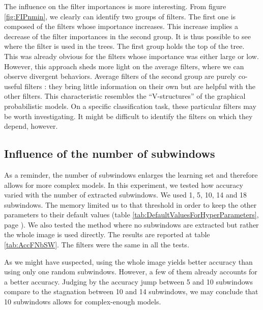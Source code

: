 \documentclass[a4paper]{report}
\newlength{\larg}
\begin{document}
	
		\par
		The influence on the filter importances is more interesting. From figure \ref{fig:FIPnmin}, we clearly can identify two groups of filters. The first one is composed of the filters whose importance increases. This increase implies a decrease of the filter importances in the second group. It is thus possible to see where the filter is used in the trees. The first group holds the top of the tree. This was already obvious for the filters whose importance was either large or low. However, this approach sheds more light on the average filters, where we can observe divergent behaviors. Average filters of the second group are purely co-useful filters : they bring little information on their own but are helpful with the other filters. This characteristic resembles the ``V-structures'' of the graphical probabilistic models. On a specific classification task, these particular filters may be worth investigating. It might be difficult to identify the filters on which they depend, however.
	
		
		
		
		
		
	
		\subsection{Influence of the number of subwindows}
		As a reminder, the number of subwindows enlarges the learning set and therefore allows for more complex models. In this experiment, we tested how accuracy varied with the number of extracted subwindows. We used 1, 5, 10, 14 and 18 subwindows. The memory limited us to that threshold in order to keep the other parameters to their default values (table \ref{tab:DefaultValuesForHyperParameters}, page \pageref{tab:DefaultValuesForHyperParameters}). We also tested the method where no subwindows are extracted but rather the whole image is used directly. The results are reported at table \ref{tab:AccFNbSW}. The filters were the same in all the tests.
		\par
		As we might have suspected, using the whole image yields better accuracy than using only one random subwindows. However, a few of them already accounts for a better accuracy. Judging by the accuracy jump between 5 and 10 subwindows compare to the stagnation between 10 and 14 subwindows, we may conclude that 10 subwindows allows for complex-enough models. 
		
\end{document}
